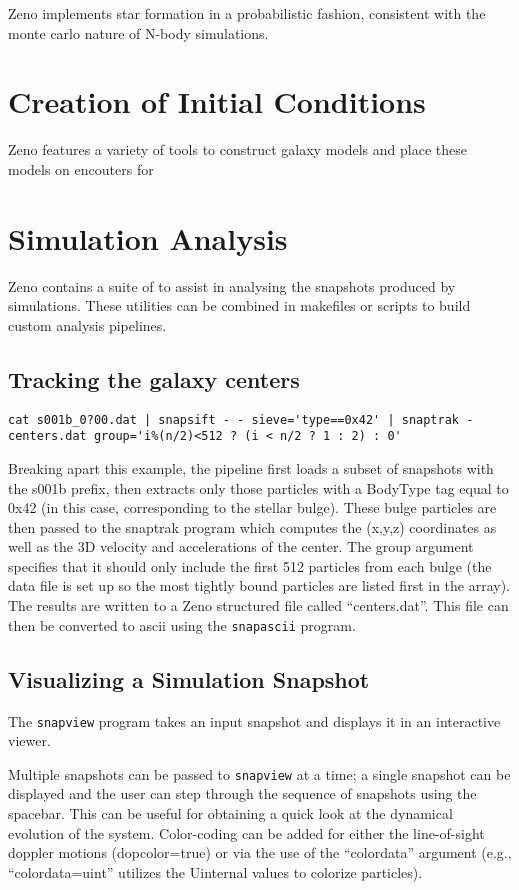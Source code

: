 \documentclass[11pt,letterpaper]{article}
\begin{document}
Zeno implements star formation in a probabilistic fashion, consistent with the monte carlo nature of N-body simulations. 

\section{Creation of Initial Conditions}
\label{sec:IC}

Zeno features a variety of tools to construct galaxy models and place these models on encouters for 

\section{Simulation Analysis}
\label{sec:Analysis}

Zeno contains a suite of to assist in analysing the snapshots produced by simulations. These utilities can be combined in makefiles or scripts to build custom analysis pipelines.

\subsection{Tracking the galaxy centers}

\begin{verbatim}
cat s001b_0?00.dat | snapsift - - sieve='type==0x42' | snaptrak - centers.dat group='i%(n/2)<512 ? (i < n/2 ? 1 : 2) : 0'
\end{verbatim}

Breaking apart this example, the pipeline first loads a subset of snapshots with the s001b prefix, then extracts only those particles with a BodyType tag equal to 0x42 (in this case, corresponding to the stellar bulge). These bulge particles are then passed to the snaptrak program which computes the (x,y,z) coordinates as well as the 3D velocity and accelerations of the center. The group argument specifies that it should only include the first 512 particles from each bulge (the data file is set up so the most tightly bound particles are listed first in the array). The results are written to a Zeno structured file called ``centers.dat''. This file can then be converted to ascii using the \texttt{snapascii} program.

\subsection{Visualizing a Simulation Snapshot}

The \texttt{snapview} program takes an input snapshot and displays it in an interactive viewer. 

Multiple snapshots can be passed to \texttt{snapview} at a time; a single snapshot can be displayed and the user can step through the sequence of snapshots using the spacebar. This can be useful for obtaining a quick look at the dynamical evolution of the system. Color-coding can be added for either the line-of-sight doppler motions (dopcolor=true) or via the use of the ``colordata'' argument (e.g., ``colordata=uint'' utilizes the Uinternal values to colorize particles).
\end{document}
